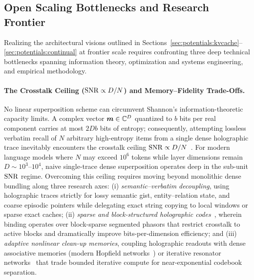 \subsection{Open Scaling Bottlenecks and Research Frontier}\label{sec:potentials:challenges}

Realizing the architectural visions outlined in Sections~\ref{sec:potentials:kvcache}--\ref{sec:potentials:continual} at frontier scale requires confronting three deep technical bottlenecks spanning information theory, optimization and systems engineering, and empirical methodology.

\paragraph{The Crosstalk Ceiling ($\mathrm{SNR} \propto D/N$) and Memory--Fidelity Trade-Offs.}
No linear superposition scheme can circumvent Shannon's information-theoretic capacity limits.
A complex vector $\boldsymbol{m} \in \mathbb{C}^D$ quantized to $b$ bits per real component carries at most $2 D b$ bits of entropy; consequently, attempting lossless verbatim recall of $N$ arbitrary high-entropy items from a single dense holographic trace inevitably encounters the crosstalk ceiling $\mathrm{SNR} \propto D / N$~\cite{PLATE_1995_HRR,FRADY_CAPACITY_VSA}.
For modern language models where $N$ may exceed $10^6$ tokens while layer dimensions remain $D \sim 10^3\text{--}10^4$, naive single-trace dense superposition operates deep in the sub-unit $\mathrm{SNR}$ regime.
Overcoming this ceiling requires moving beyond monolithic dense bundling along three research axes:
(i) \emph{semantic--verbatim decoupling}, using holographic traces strictly for lossy semantic gist, entity--relation state, and coarse episodic pointers while delegating exact string copying to local windows or sparse exact caches;
(ii) \emph{sparse and block-structured holographic codes}~\cite{SCHLEGEL_VSA_COMPARISON,KLEYKO_VSA_SURVEY}, wherein binding operates over block-sparse segmented phasors that restrict crosstalk to active blocks and dramatically improve bits-per-dimension efficiency; and
(iii) \emph{adaptive nonlinear clean-up memories}, coupling holographic readouts with dense associative memories (modern Hopfield networks~\cite{RAMSAUER_MODERN_HOPFIELD}) or iterative resonator networks~\cite{FRADY_2020_RESONATOR} that trade bounded iterative compute for near-exponential codebook separation.

